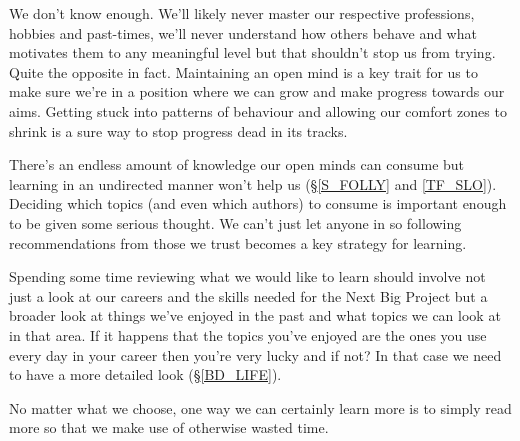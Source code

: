 \cleardoublepage
\begin{multicols}{2}

We don't know enough. We'll likely never master our respective professions, hobbies and past-times, we'll never understand how others behave and what motivates them to any meaningful level but that shouldn't stop us from trying. Quite the opposite in fact. Maintaining an open mind is a key trait for us to make sure we're in a position where we can grow and make progress towards our aims. Getting stuck into patterns of behaviour and allowing our comfort zones to shrink is a sure way to stop progress dead in its tracks.

There's an endless amount of knowledge our open minds can consume but learning in an undirected manner won't help us (\S \ref{S_FOLLY} and \ref{TF_SLO}). 
Deciding which topics (and even which authors) to consume is important enough to be given some serious thought. We can't just let anyone in so following recommendations from those we trust becomes a key strategy for learning.

Spending some time reviewing what we would like to learn should involve not just a look at our careers and the skills needed for the Next Big Project but a broader look at things we've enjoyed in the past and what topics we can look at in that area. If it happens that the topics you've enjoyed are the ones you use every day in your career then you're very lucky and if not? In that case we need to have a more detailed look (\S \ref{BD_LIFE}).

No matter what we choose, one way we can certainly learn more is to simply read more so that we make use of otherwise wasted time. 

\end{multicols}
\clearpage
